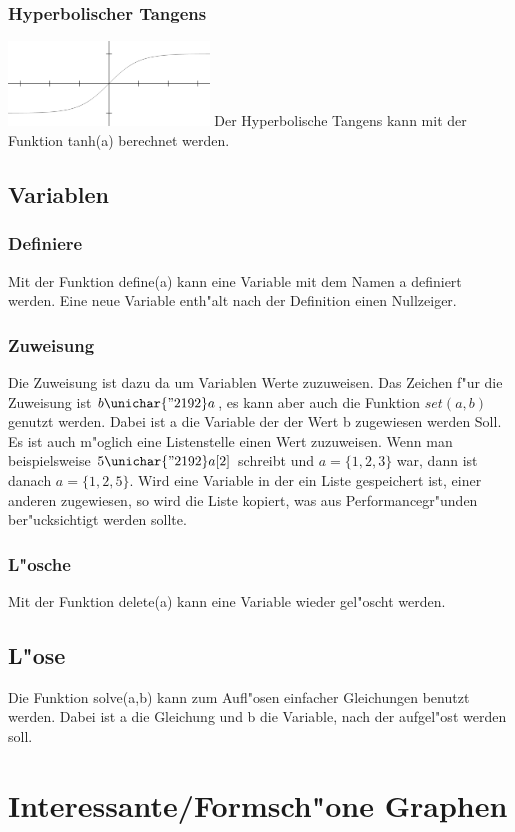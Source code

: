\documentclass{scrartcl}
\begin{document}
\subsubsection{Hyperbolischer Tangens}
\includegraphics[width=0.4\textwidth]{images/functions/hyperbolic_tangens.png}\newline
Der Hyperbolische Tangens kann mit der Funktion tanh(a) berechnet werden.
\subsection{Variablen}
\subsubsection{Definiere}
Mit der Funktion define(a) kann eine Variable mit dem Namen a definiert werden. Eine neue Variable enth"alt nach der Definition einen Nullzeiger.
\subsubsection{Zuweisung}
Die Zuweisung ist dazu da um Variablen Werte zuzuweisen. Das Zeichen f"ur die Zuweisung ist \(b \unichar{"2192} a\), es kann aber auch die Funktion \(set(a,b)\) genutzt werden. Dabei ist a die Variable der der Wert b zugewiesen werden Soll. Es ist auch m"oglich eine Listenstelle einen Wert zuzuweisen. Wenn man beispielsweise \(5 \unichar{"2192} a[2]\) schreibt und \(a = \{1,2,3\}\) war, dann ist danach \(a = \{1,2,5\}\). Wird eine Variable in der ein Liste gespeichert ist, einer anderen zugewiesen, so wird die Liste kopiert, was aus Performancegr"unden ber"ucksichtigt werden sollte.
\subsubsection{L"osche}
Mit der Funktion delete(a) kann eine Variable wieder gel"oscht werden.
\subsection{L"ose}
Die Funktion solve(a,b) kann zum Aufl"osen einfacher Gleichungen benutzt werden. Dabei ist a die Gleichung und b die Variable, nach der aufgel"ost werden soll.
\newpage
\section{Interessante/Formsch"one Graphen}
\end{document}
